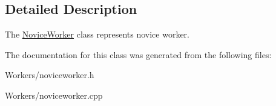 \subsection{Detailed Description}
The \hyperlink{class_game_1_1_novice_worker}{Novice\-Worker} class represents novice worker. 

The documentation for this class was generated from the following files\-:\begin{DoxyCompactItemize}
\item 
Workers/noviceworker.\-h\item 
Workers/noviceworker.\-cpp\end{DoxyCompactItemize}
